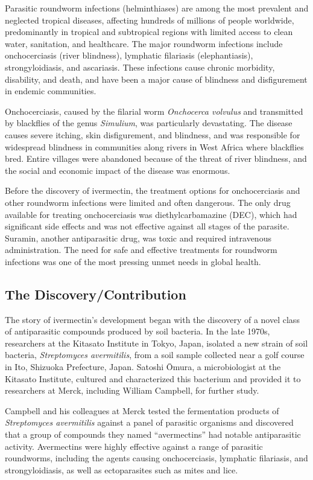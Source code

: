 Parasitic roundworm infections (helminthiases) are among the most prevalent and neglected tropical diseases, affecting hundreds of millions of people worldwide, predominantly in tropical and subtropical regions with limited access to clean water, sanitation, and healthcare. The major roundworm infections include onchocerciasis (river blindness), lymphatic filariasis (elephantiasis), strongyloidiasis, and ascariasis. These infections cause chronic morbidity, disability, and death, and have been a major cause of blindness and disfigurement in endemic communities.

Onchocerciasis, caused by the filarial worm \textit{Onchocerca volvulus} and transmitted by blackflies of the genus \textit{Simulium}, was particularly devastating. The disease causes severe itching, skin disfigurement, and blindness, and was responsible for widespread blindness in communities along rivers in West Africa where blackflies bred. Entire villages were abandoned because of the threat of river blindness, and the social and economic impact of the disease was enormous.

Before the discovery of ivermectin, the treatment options for onchocerciasis and other roundworm infections were limited and often dangerous. The only drug available for treating onchocerciasis was diethylcarbamazine (DEC), which had significant side effects and was not effective against all stages of the parasite. Suramin, another antiparasitic drug, was toxic and required intravenous administration. The need for safe and effective treatments for roundworm infections was one of the most pressing unmet needs in global health.

\subsection{The Discovery/Contribution}

The story of ivermectin's development began with the discovery of a novel class of antiparasitic compounds produced by soil bacteria. In the late 1970s, researchers at the Kitasato Institute in Tokyo, Japan, isolated a new strain of soil bacteria, \textit{Streptomyces avermitilis}, from a soil sample collected near a golf course in Ito, Shizuoka Prefecture, Japan. Satoshi \=Omura, a microbiologist at the Kitasato Institute, cultured and characterized this bacterium and provided it to researchers at Merck, including William Campbell, for further study.

Campbell and his colleagues at Merck tested the fermentation products of \textit{Streptomyces avermitilis} against a panel of parasitic organisms and discovered that a group of compounds they named ``avermectins'' had notable antiparasitic activity. Avermectins were highly effective against a range of parasitic roundworms, including the agents causing onchocerciasis, lymphatic filariasis, and strongyloidiasis, as well as ectoparasites such as mites and lice.

